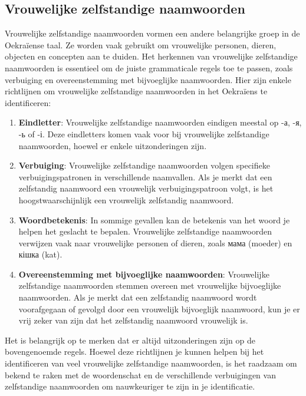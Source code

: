 \documentclass[
  letterpaper,
  DIV=11,
  numbers=noendperiod]{scrreprt}
\begin{document}
\hypertarget{vrouwelijke-zelfstandige-naamwoorden}{%
\subsection{Vrouwelijke zelfstandige
naamwoorden}\label{vrouwelijke-zelfstandige-naamwoorden}}

Vrouwelijke zelfstandige naamwoorden vormen een andere belangrijke groep
in de Oekraïense taal. Ze worden vaak gebruikt om vrouwelijke personen,
dieren, objecten en concepten aan te duiden. Het herkennen van
vrouwelijke zelfstandige naamwoorden is essentieel om de juiste
grammaticale regels toe te passen, zoals verbuiging en overeenstemming
met bijvoeglijke naamwoorden. Hier zijn enkele richtlijnen om
vrouwelijke zelfstandige naamwoorden in het Oekraïens te identificeren:

\begin{enumerate}
\def\labelenumi{\arabic{enumi}.}
\item
  \textbf{Eindletter}: Vrouwelijke zelfstandige naamwoorden eindigen
  meestal op -а, -я, -ь of -і. Deze eindletters komen vaak voor bij
  vrouwelijke zelfstandige naamwoorden, hoewel er enkele uitzonderingen
  zijn.
\item
  \textbf{Verbuiging}: Vrouwelijke zelfstandige naamwoorden volgen
  specifieke verbuigingspatronen in verschillende naamvallen. Als je
  merkt dat een zelfstandig naamwoord een vrouwelijk verbuigingspatroon
  volgt, is het hoogstwaarschijnlijk een vrouwelijk zelfstandig
  naamwoord.
\item
  \textbf{Woordbetekenis}: In sommige gevallen kan de betekenis van het
  woord je helpen het geslacht te bepalen. Vrouwelijke zelfstandige
  naamwoorden verwijzen vaak naar vrouwelijke personen of dieren, zoals
  мама (moeder) en кішка (kat).
\item
  \textbf{Overeenstemming met bijvoeglijke naamwoorden}: Vrouwelijke
  zelfstandige naamwoorden stemmen overeen met vrouwelijke bijvoeglijke
  naamwoorden. Als je merkt dat een zelfstandig naamwoord wordt
  voorafgegaan of gevolgd door een vrouwelijk bijvoeglijk naamwoord, kun
  je er vrij zeker van zijn dat het zelfstandig naamwoord vrouwelijk is.
\end{enumerate}

Het is belangrijk op te merken dat er altijd uitzonderingen zijn op de
bovengenoemde regels. Hoewel deze richtlijnen je kunnen helpen bij het
identificeren van veel vrouwelijke zelfstandige naamwoorden, is het
raadzaam om bekend te raken met de woordenschat en de verschillende
verbuigingen van zelfstandige naamwoorden om nauwkeuriger te zijn in je
identificatie.
\end{document}
